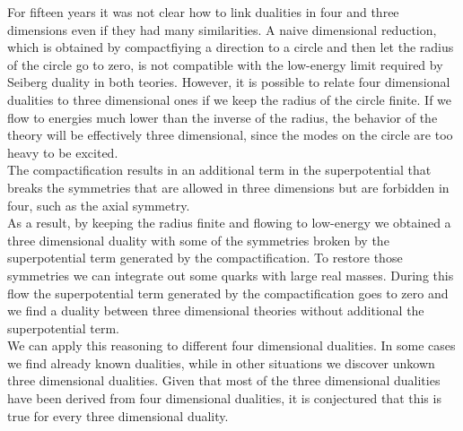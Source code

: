 For fifteen years it was not clear how to link dualities in four and three dimensions even if they had many similarities. 
A naive dimensional reduction, which is obtained by compactfiying a direction to a circle and then let the radius of the circle go to zero, is not compatible with the low-energy limit required by Seiberg duality in both teories.  
However, it is possible to relate four dimensional dualities to three dimensional ones if we keep the radius of the circle finite. 
If we flow to energies much lower than the inverse of the radius, the behavior of the theory will be effectively three dimensional, since the modes on the circle are too heavy to be excited.\\
The compactification results in an additional term in the superpotential that breaks the symmetries that are allowed in three dimensions but are forbidden in four, such as the axial symmetry.\\
As a result, by keeping the radius finite and flowing to low-energy we obtained a three dimensional duality with some of the symmetries broken by the superpotential term generated by the compactification. 
To restore those symmetries we can integrate out some quarks with large real masses. During this flow the superpotential term generated by the compactification goes to zero and we find a duality between three dimensional theories without additional the superpotential term.\\
We can apply this reasoning to different four dimensional dualities. 
In some cases we find already known dualities, while in other situations we discover unkown three dimensional dualities. 
Given that most of the three dimensional dualities have been derived from four dimensional dualities, it is conjectured that this is true for every three dimensional duality.\\

